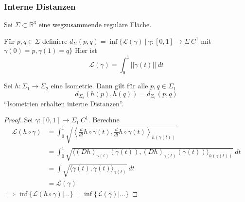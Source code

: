 \documentclass[../main.tex]{subfiles}
\begin{document}
\subsubsection*{Interne Distanzen}
Sei $\Sigma \subset \mathbb{R}^3$ eine wegzusammende reguläre Fläche.

\begin{definition}
    Für $p,q \in \Sigma$ definiere $d_{\Sigma}(p,q)= \inf \{ \mathcal{L}(\gamma) \ | \ \gamma : [0,1]\to \Sigma \ C^1$ mit $\gamma(0)=p, \gamma(1)=q\}$
    Hier ist $$\mathcal{L}(\gamma)=\int _0 ^1 ||\dot{\gamma}(t)|| \ dt$$
\end{definition}

\begin{lemma}
    Sei $h: \Sigma_1 \to \Sigma_2$ eine Isometrie. Dann gilt für alle $p,q \in \Sigma_1$
    $$d_{\Sigma_2}(h(p), h(q))=d_{\Sigma_1}(p,q)$$
    ``Isometrien erhalten interne Distanzen''.
\end{lemma}

\begin{proof}
    Sei $\gamma:[0,1]\to \Sigma_1 \ C^1$. Berechne
    \begin{align*}
        \mathcal{L}(h \circ \gamma) &= \int _0 ^1 \sqrt{\left\langle \frac{d}{dt}h\circ \gamma (t), \frac{d}{dt}h\circ \gamma (t) \right\rangle _{h(\gamma(t))}} \\
        &= \int _0 ^1 \sqrt{\langle (Dh)_{\gamma (t)}(\dot{\gamma}(t)), (Dh)_{\gamma (t)}(\dot{\gamma}(t)) \rangle _{h(\gamma(t))}} \ dt \\
        &= \int \sqrt{\langle \dot{\gamma}(t), \dot{\gamma}(t) \rangle _{\gamma(t)}} \ dt \\
        &= \mathcal{L}(\gamma)
    \end{align*}
    $\implies \inf \{ \mathcal{L}(h \circ \gamma) | \dots \} = \inf \{ \mathcal{L}(\gamma) | \dots \} $
\end{proof}
\end{document}
